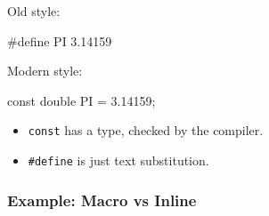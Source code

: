 \documentclass[
  letterpaper,
  DIV=11,
  numbers=noendperiod]{scrreprt}
\newenvironment{Shaded}{\begin{snugshade}}{\end{snugshade}}
\newcommand{\DataTypeTok}[1]{\textcolor[rgb]{0.68,0.00,0.00}{#1}}
\newcommand{\FloatTok}[1]{\textcolor[rgb]{0.68,0.00,0.00}{#1}}
\newcommand{\NormalTok}[1]{\textcolor[rgb]{0.00,0.23,0.31}{#1}}
\newcommand{\OperatorTok}[1]{\textcolor[rgb]{0.37,0.37,0.37}{#1}}
\newcommand{\PreprocessorTok}[1]{\textcolor[rgb]{0.68,0.00,0.00}{#1}}
\providecommand{\tightlist}{%
  \setlength{\itemsep}{0pt}\setlength{\parskip}{0pt}}
\begin{document}
Old style:

\begin{Shaded}
\begin{Highlighting}[]
\PreprocessorTok{\#define PI }\FloatTok{3.14159}
\end{Highlighting}
\end{Shaded}

Modern style:

\begin{Shaded}
\begin{Highlighting}[]
\DataTypeTok{const} \DataTypeTok{double}\NormalTok{ PI }\OperatorTok{=} \FloatTok{3.14159}\OperatorTok{;}
\end{Highlighting}
\end{Shaded}

\begin{itemize}
\tightlist
\item
  \texttt{const} has a type, checked by the compiler.
\item
  \texttt{\#define} is just text substitution.
\end{itemize}

\subsubsection{Example: Macro vs Inline}\label{example-macro-vs-inline}
\end{document}
